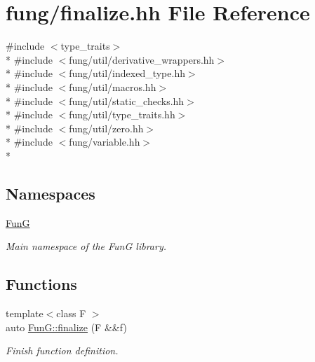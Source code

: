 \hypertarget{finalize_8hh}{\section{fung/finalize.hh File Reference}
\label{finalize_8hh}
}
{\ttfamily \#include $<$type\-\_\-traits$>$}\\*
{\ttfamily \#include $<$fung/util/derivative\-\_\-wrappers.\-hh$>$}\\*
{\ttfamily \#include $<$fung/util/indexed\-\_\-type.\-hh$>$}\\*
{\ttfamily \#include $<$fung/util/macros.\-hh$>$}\\*
{\ttfamily \#include $<$fung/util/static\-\_\-checks.\-hh$>$}\\*
{\ttfamily \#include $<$fung/util/type\-\_\-traits.\-hh$>$}\\*
{\ttfamily \#include $<$fung/util/zero.\-hh$>$}\\*
{\ttfamily \#include $<$fung/variable.\-hh$>$}\\*
\subsection*{Namespaces}
\begin{DoxyCompactItemize}
\item 
\hyperlink{namespaceFunG}{Fun\-G}
\begin{DoxyCompactList}\small\item\em Main namespace of the Fun\-G library. \end{DoxyCompactList}\end{DoxyCompactItemize}
\subsection*{Functions}
\begin{DoxyCompactItemize}
\item 
{\footnotesize template$<$class F $>$ }\\auto \hyperlink{namespaceFunG_ac59f2ececc3cd451860776320a4a93d5}{Fun\-G\-::finalize} (F \&\&f)
\begin{DoxyCompactList}\small\item\em Finish function definition. \end{DoxyCompactList}\end{DoxyCompactItemize}
